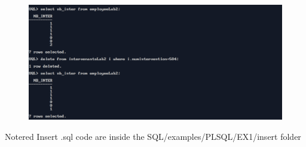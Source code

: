 



\newpage
\begin{figure}[ht]
    \centering
    \includegraphics[width=\textwidth]{SQL/examples/PLSQL/EX1/PNG/ex11.3.png}
\end{figure}

\vspace{0.5cm}

\begin{prettyBox}{Note}{red}
Insert .sql code are inside the SQL/examples/PLSQL/EX1/insert folder
\end{prettyBox}

